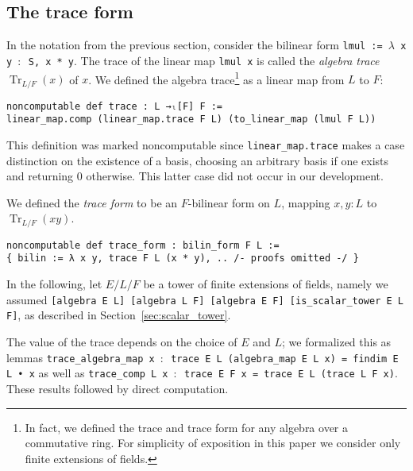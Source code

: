 \documentclass[a4paper,USenglish,cleveref, autoref, thm-restate]{lipics-v2021}
\newcommand{\lean}[1]{\texttt{#1}\xspace} %
\DeclareMathOperator{\Tr}{Tr}
\begin{document}
\subsection{The trace form}\label{sec:trace-form}
In the notation from the previous section, consider the bilinear form \lean{lmul := $\lambda$ x y $:$ S, x~*~y}.
The trace of the linear map \lean{lmul x} is called the \emph{algebra trace} $\Tr_{L / F}(x)$ of $x$.
We defined the algebra trace\footnote{In fact, we defined the trace and trace form for any algebra over a commutative ring.
For simplicity of exposition in this paper we consider only finite extensions of fields.} as a linear map from $L$ to $F$:
\begin{lstlisting}
noncomputable def trace : L →ₗ[F] F :=
linear_map.comp (linear_map.trace F L) (to_linear_map (lmul F L))
\end{lstlisting}
This definition was marked noncomputable since \lean{linear\_map.trace} makes a case distinction on the existence of a basis,
choosing an arbitrary basis if one exists and returning $0$ otherwise.
This latter case did not occur in our development.

We defined the \emph{trace form} to be an $F$-bilinear form on $L$, mapping $x, y : L$ to $\Tr_{L/F}(xy)$.
\begin{lstlisting}
noncomputable def trace_form : bilin_form F L :=
{ bilin := λ x y, trace F L (x * y), .. /- proofs omitted -/ }
\end{lstlisting}

In the following, let $E / L / F$ be a tower of finite extensions of fields, namely we assumed \lean{[algebra E L] [algebra L F] [algebra E F] [is\_scalar\_tower E L F]}, as described in Section~\ref{sec:scalar_tower}.

The value of the trace depends on the choice of $E$ and $L$; we formalized this as lemmas \lean{trace\_algebra\_map x $:$ trace E L (algebra\_map E L x) = findim E L • x} as well as \lean{trace\_comp L x $:$ trace E F x = trace E L (trace L F x)}.
These results followed by direct computation.
\end{document}
